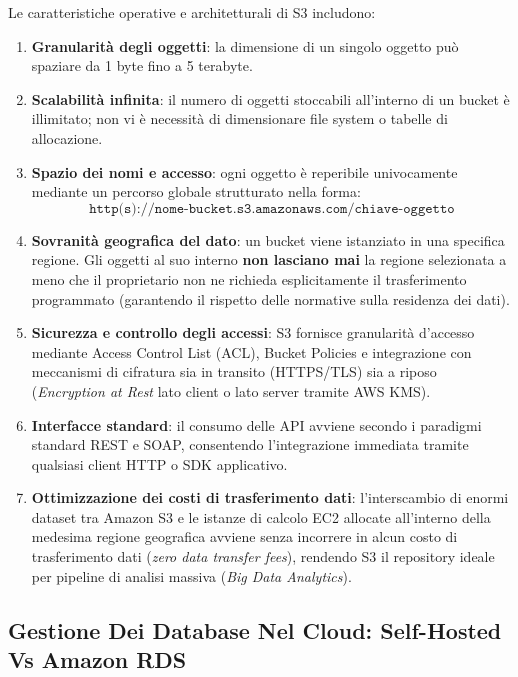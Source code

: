 \documentclass[11pt, a4paper]{article}
\begin{document}
Le caratteristiche operative e architetturali di S3 includono:
\begin{enumerate}
    \item \textbf{Granularità degli oggetti}: la dimensione di un singolo oggetto può spaziare da 1 byte fino a 5 terabyte.
    \item \textbf{Scalabilità infinita}: il numero di oggetti stoccabili all'interno di un bucket è illimitato; non vi è necessità di dimensionare file system o tabelle di allocazione.
    \item \textbf{Spazio dei nomi e accesso}: ogni oggetto è reperibile univocamente mediante un percorso globale strutturato nella forma:
    \begin{equation*}
        \texttt{http(s)://nome-bucket.s3.amazonaws.com/chiave-oggetto}
    \end{equation*}
    \item \textbf{Sovranità geografica del dato}: un bucket viene istanziato in una specifica regione. Gli oggetti al suo interno \textbf{non lasciano mai} la regione selezionata a meno che il proprietario non ne richieda esplicitamente il trasferimento programmato (garantendo il rispetto delle normative sulla residenza dei dati).
    \item \textbf{Sicurezza e controllo degli accessi}: S3 fornisce granularità d'accesso mediante Access Control List (ACL), Bucket Policies e integrazione con meccanismi di cifratura sia in transito (HTTPS/TLS) sia a riposo (\emph{Encryption at Rest} lato client o lato server tramite AWS KMS).
    \item \textbf{Interfacce standard}: il consumo delle API avviene secondo i paradigmi standard REST e SOAP, consentendo l'integrazione immediata tramite qualsiasi client HTTP o SDK applicativo.
    \item \textbf{Ottimizzazione dei costi di trasferimento dati}: l'interscambio di enormi dataset tra Amazon S3 e le istanze di calcolo EC2 allocate all'interno della medesima regione geografica avviene senza incorrere in alcun costo di trasferimento dati (\emph{zero data transfer fees}), rendendo S3 il repository ideale per pipeline di analisi massiva (\emph{Big Data Analytics}).
\end{enumerate}

\subsection{Gestione Dei Database Nel Cloud: Self-Hosted Vs Amazon RDS}
\end{document}

